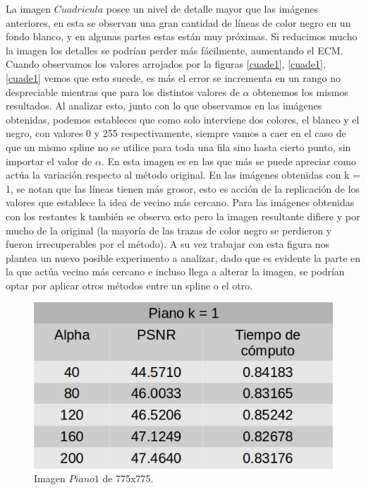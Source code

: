 \documentclass[a4paper]{article}
\newcounter{col}
\begin{document}
La imagen $Cuadricula$ posee un nivel de detalle mayor que las imágenes anteriores, en esta se observan una gran cantidad de líneas de color negro en un fondo blanco, y en algunas partes estas están muy próximas.
 Si reducimos mucho la imagen los detalles se podrían perder más fácilmente, aumentando el ECM. Cuando observamos los valores arrojados por la figuras \ref{cuade1}, \ref{cuade1}, \ref{cuade1} vemos que esto sucede, es más el error se incrementa en un rango no despreciable mientras que para los distintos valores de  $\alpha$ obtenemos los mismos resultados. Al analizar esto, junto con lo que observamos en las imágenes obtenidas, podemos estableces que como solo interviene dos colores, el blanco y el negro, con valores 0 y 255 respectivamente, siempre vamos a caer en el caso de que un mismo spline no se utilice para toda una fila sino hasta cierto punto, sin importar el valor de $\alpha$.
 En esta imagen es en las que más se puede apreciar como actúa la variación respecto al método original. En las imágenes obtenidas con  k = 1, se notan que las líneas tienen más grosor, esto es acción de la replicación de los valores que establece la idea de vecino más cercano. Para las imágenes obtenidas con los restantes k también se observa esto pero la imagen resultante difiere y por mucho de la original (la mayoría de las trazas de color negro se perdieron y fueron irrecuperables por el método). A su vez trabajar con esta figura nos plantea un nuevo posible experimento a analizar, dado que es evidente la parte en la que actúa vecino más cercano e incluso llega a alterar la imagen, se podrían optar por aplicar otros métodos entre un spline o el otro.

        
    \begin{figure}[H]
    \centering
    \includegraphics[scale=0.4]{imagenes/piano1.jpg}
    \caption{Imagen $Piano1$ de 775x775.}
	\label{piano1}
    \end{figure}
    
\end{document}
